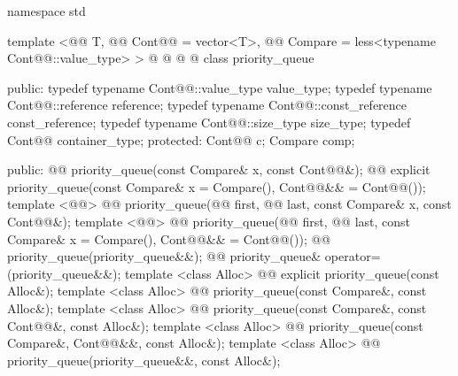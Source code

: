 \documentclass[american,twoside]{book}
\begin{document}
\begin{codeblock}
namespace std {
  template <@@ T, @@ Cont@@ = vector<T>,
       @@ Compare = less<typename Cont@@::value_type> >
  @ @
           @\addedConcepts{\&\&} @
  class priority_queue { 
  public:
    typedef typename Cont@@::value_type            value_type;
    typedef typename Cont@@::reference             reference;
    typedef typename Cont@@::const_reference       const_reference;
    typedef typename Cont@@::size_type             size_type;
    typedef          Cont@@                        container_type;
  protected:
    Cont@@ c;
    Compare comp;

  public:
    @@ priority_queue(const Compare& x, const Cont@@&);
    @@ 
      explicit priority_queue(const Compare& x = Compare(), Cont@@&& = Cont@@());
    template <@@>
      @@
      priority_queue(@@ first, @@ last,
             const Compare& x, const Cont@@&);
    template <@@>
      @@
      priority_queue(@@ first, @@ last,
             const Compare& x = Compare(), Cont@@&& = Cont@@());
    @@ priority_queue(priority_queue&&);
    @@ priority_queue& operator=(priority_queue&&);
    template <class Alloc> 
      @@
      explicit priority_queue(const Alloc&);
    template <class Alloc> 
      @@
      priority_queue(const Compare&, const Alloc&);
    template <class Alloc> 
      @@
      priority_queue(const Compare&, const Cont@@&, const Alloc&);
    template <class Alloc> 
      @@
      priority_queue(const Compare&, Cont@@&&, const Alloc&);
    template <class Alloc> 
      @@
      priority_queue(priority_queue&&, const Alloc&);

}}
\end{codeblock}
\end{document}

